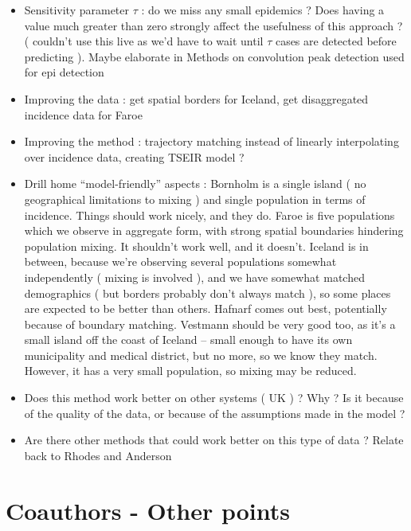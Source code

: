 \documentclass[10pt]{article}
\begin{document}
\begin{itemize}
\item Sensitivity parameter $\tau$ : do we miss any small epidemics ? Does having a value much greater than zero strongly affect the usefulness of this approach ? ( couldn't use this live as we'd have to wait until $\tau$ cases are detected before predicting ). Maybe elaborate in Methods on convolution peak detection used for epi detection 
\item Improving the data : get spatial borders for Iceland, get disaggregated incidence data for Faroe 
\item Improving the method : trajectory matching instead of linearly interpolating over incidence data, creating TSEIR model ?
\item Drill home ``model-friendly'' aspects : Bornholm is a single island ( no geographical limitations to mixing ) and single population in terms of incidence. Things should work nicely, and they do. Faroe is five populations which we observe in aggregate form, with strong spatial boundaries hindering population mixing. It shouldn't work well, and it doesn't. Iceland is in between, because we're observing several populations somewhat independently ( mixing is involved ), and we have somewhat matched demographics ( but borders probably don't always match ), so some places are expected to be better than others. Hafnarf comes out best, potentially because of boundary matching. Vestmann should be very good too, as it's a small island off the coast of Iceland -- small enough to have its own municipality and medical district, but no more, so we know they match. However, it has a very small population, so mixing may be reduced.
\item Does this method work better on other systems ( UK ) ? Why ? Is it because of the quality of the data, or because of the assumptions made in the model ?
\item Are there other methods that could work better on this type of data ? Relate back to Rhodes and Anderson
\end{itemize}















\section*{Coauthors - Other points}
\end{document}
